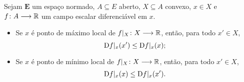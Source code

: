 \begin{proposition}
\label{prop:extremo.local.diferencial}
Sejam $\bm E$ um espaço normado, $A \subseteq E$ aberto, $X \subseteq A$ convexo, $x \in X$ e $f\colon \allowbreak A \longrightarrow \mathbb{R}$ um campo escalar diferenciável em $x$.
	\begin{itemize}
		\item Se $x$ é ponto de máximo local de $f|_X\colon \allowbreak X \longrightarrow \mathbb{R}$, então, para todo $x' \in X$,
			\begin{equation*}
			\mathrm{D} f|_x(x') \leq \mathrm{D} f|_x(x);
			\end{equation*}
		\item Se $x$ é ponto de mínimo local de $f|_X\colon \allowbreak X \longrightarrow \mathbb{R}$, então, para todo $x' \in X$,
			\begin{equation*}
			\mathrm{D} f|_x(x) \leq \mathrm{D} f|_x(x').
			\end{equation*}
	\end{itemize}
\end{proposition}
